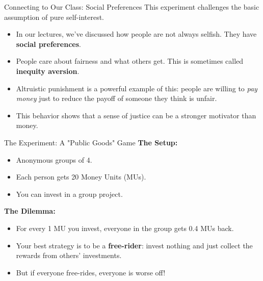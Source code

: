 \documentclass{beamer}
\begin{document}
\begin{frame}{Connecting to Our Class: Social Preferences}
    This experiment challenges the basic assumption of pure self-interest.
    \begin{itemize}
        \item<1-> In our lectures, we've discussed how people are not always selfish. They have \textbf{social preferences}.
        \pause
        \item<2-> People care about fairness and what others get. This is sometimes called \textbf{inequity aversion}.
        \pause
        \item<3-> Altruistic punishment is a powerful example of this: people are willing to \textit{pay money} just to reduce the payoff of someone they think is unfair.
        \pause
        \item<4-> This behavior shows that a sense of justice can be a stronger motivator than money.
    \end{itemize}
\end{frame}

\begin{frame}{The Experiment: A "Public Goods" Game}
    \textbf{The Setup:}
    \begin{itemize}
        \item Anonymous groups of 4.
        \item Each person gets 20 Money Units (MUs).
        \item You can invest in a group project.
    \end{itemize}
    \pause
    \textbf{The Dilemma:}
    \begin{itemize}
        \item For every 1 MU you invest, everyone in the group gets 0.4 MUs back.
        \item Your best strategy is to be a \textbf{free-rider}: invest nothing and just collect the rewards from others' investments.
        \item But if everyone free-rides, everyone is worse off!
    \end{itemize}
\end{frame}
\end{document}
